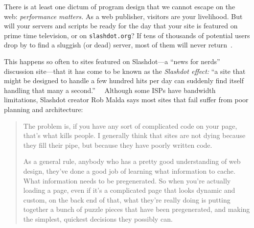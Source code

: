 \documentclass{elsart}
\begin{document}
There is at least one dictum of program design that we cannot escape
on the web: \emph{performance matters.}  As a web publisher, visitors
are your livelihood.  But will your servers and scripts be ready for
the day that your site is featured on prime time television, or on
\texttt{slashdot.org}?  If tens of thousands of potential users drop
by to find a sluggish (or dead) server, most of them will never
return~\cite{greenspun99panda}.

This happens so often to sites featured on Slashdot---a
``news for nerds'' discussion site---that it has come to be
known as the \emph{Slashdot effect:} ``a site that might be
designed to handle a few hundred hits per day can suddenly
find itself handling that many a
second.''~\cite{turner03slashdot}~ Although some ISPs have
bandwidth limitations, Slashdot creator Rob Malda says most
sites that fail suffer from poor planning and architecture:
\begin{quote}
  The problem is, if you have any sort of complicated code
  on your page, that's what kills people. I generally think
  that sites are not dying because they fill their pipe, but
  because they have poorly written code.
  
  As a general rule, anybody who has a pretty good
  understanding of web design, they've done a good job of
  learning what information to cache. What information needs
  to be pregenerated. So when you're actually loading a
  page, even if it's a complicated page that looks dynamic
  and custom, on the back end of that, what they're really
  doing is putting together a bunch of puzzle pieces that
  have been pregenerated, and making the simplest, quickest
  decisions they possibly can.~\cite{turner03slashdot}
\end{quote}
\end{document}
